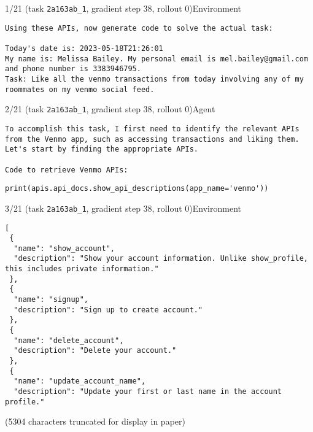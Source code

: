 
\hspace*{8mm}%
\begin{minipage}{0.95\linewidth}
\begin{user_message_box}{{1/21 (task \texttt{2a163ab\_1}, gradient step 38, rollout 0)\hfill Environment}}
\scriptsize
\begin{Verbatim}[breaklines]
Using these APIs, now generate code to solve the actual task:

Today's date is: 2023-05-18T21:26:01
My name is: Melissa Bailey. My personal email is mel.bailey@gmail.com and phone number is 3383946795.
Task: Like all the venmo transactions from today involving any of my roommates on my venmo social feed.
\end{Verbatim}
\end{user_message_box}
\end{minipage}

\begin{minipage}{0.95\linewidth}
\begin{assistant_message_box}{{2/21 (task \texttt{2a163ab\_1}, gradient step 38, rollout 0)\hfill Agent}}
\scriptsize
\begin{Verbatim}[breaklines]
To accomplish this task, I first need to identify the relevant APIs from the Venmo app, such as accessing transactions and liking them. Let's start by finding the appropriate APIs.

Code to retrieve Venmo APIs:
\end{Verbatim}
\begin{tcolorbox}[colback=codebgcolor,boxrule=0pt]\begin{Verbatim}[breaklines]
print(apis.api_docs.show_api_descriptions(app_name='venmo'))
\end{Verbatim}
\end{tcolorbox}\end{assistant_message_box}
\end{minipage}

\hspace*{8mm}%
\begin{minipage}{0.95\linewidth}
\begin{user_message_box}{{3/21 (task \texttt{2a163ab\_1}, gradient step 38, rollout 0)\hfill Environment}}
\scriptsize
\begin{Verbatim}[breaklines]
[
 {
  "name": "show_account",
  "description": "Show your account information. Unlike show_profile, this includes private information."
 },
 {
  "name": "signup",
  "description": "Sign up to create account."
 },
 {
  "name": "delete_account",
  "description": "Delete your account."
 },
 {
  "name": "update_account_name",
  "description": "Update your first or last name in the account profile."
\end{Verbatim}
(5304 characters truncated for display in paper)\end{user_message_box}
\end{minipage}

